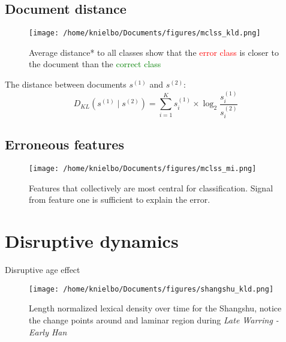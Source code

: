 \subsection{Document distance}
\begin{frame}
\begin{figure}
	\centering
	\texttt{[image: /home/knielbo/Documents/figures/mclss\_kld.png]}
	\caption{Average distance* to all classes show that the \textcolor{red}{error class} is closer to the document than the \textcolor{green}{correct class}}
\end{figure}
The distance between documents $s^{(1)}$ and $s^{(2)}$:
\begin{equation*}
D_{KL}(s^{(1)} \mid s^{(2)}) = \sum_{i = 1}^{K} s_i^{(1)} \times \log_2 \frac{s_i^{(1)}}{s_i^{(2)}}
\end{equation*}
\end{frame}

\subsection{Erroneous features}
\begin{frame}
\begin{figure}
	\centering
	\texttt{[image: /home/knielbo/Documents/figures/mclss\_mi.png]}
	\caption{Features that collectively are most central for classification. Signal from feature one is sufficient to explain the error.}
\end{figure}
\end{frame}


\section{Disruptive dynamics}

\begin{frame}{Disruptive age effect}
\begin{figure}
	\centering
	\texttt{[image: /home/knielbo/Documents/figures/shangshu\_kld.png]}
	\caption{Length normalized lexical density over time for the Shangshu, notice the change points around and laminar region during \emph{Late Warring - Early Han}}
\end{figure}
\end{frame}

